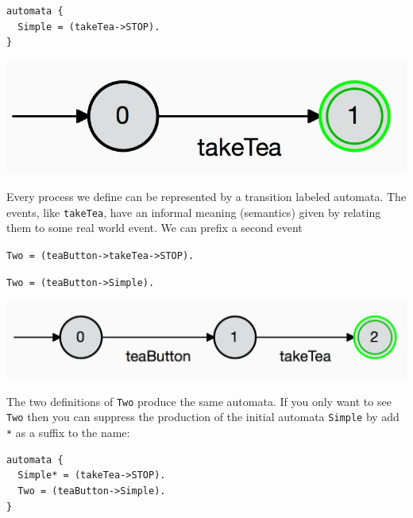 \documentclass[]{article}
\begin{document}
\noindent\hspace{\fill} \begin{minipage}{0.4\textwidth}
\begin{verbatim}
automata {
  Simple = (takeTea->STOP).
}\end{verbatim} 
\end{minipage}
\begin{minipage}{0.25\textwidth}\includegraphics[scale=0.15]{Simple.jpg}\end{minipage}\hspace{\fill}

\noindent  Every process we define can be represented by a transition labeled automata. The events, like  \verb$takeTea$,  have an informal meaning (semantics) given by relating them to  some  real world event. We can prefix  a second event  

\noindent\begin{center}  \begin{minipage}{0.45\textwidth}
\verb$Two = (teaButton->takeTea->STOP).$ 

\verb$Two = (teaButton->Simple).$   \end{minipage}\begin{minipage}{0.45\textwidth}\includegraphics[scale=0.15]{Two.jpg}\end{minipage}\end{center}

The two definitions of \verb|Two| produce the same automata. If you only want to see \verb|Two| then you can suppress the production of the initial automata \verb|Simple| by add \verb|*| as a suffix to the name:

\noindent\begin{center}  
\begin{minipage}{0.45\textwidth}\begin{verbatim}
automata {
  Simple* = (takeTea->STOP).
  Two = (teaButton->Simple).
}\end{verbatim} \end{minipage}
\end{center}
\end{document}
